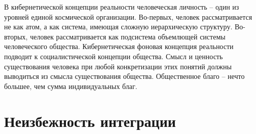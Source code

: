 \documentclass{book}
\begin{document}
В кибернетической концепции реальности человеческая лич­ность -- один из уровней единой космической организации. Во-первых, человек рассматривается не как атом, а как систе­ма, имеющая сложную иерархическую структуру. Во-вторых, человек рассматривается как подсистема объемлющей систе­мы человеческого общества. Кибернетическая фоновая кон­цепция реальности подводит к социалистической концепции общества. Смысл и ценность существования человека при любой конкретизации этих понятий должны выводиться из смысла существования общества. Общественное благо -- нечто большее, чем сумма индивидуальных благ.

\section{Неизбежность интеграции}
\end{document}
